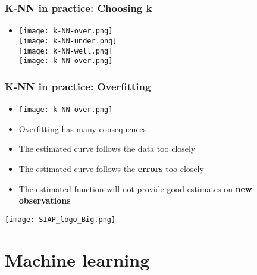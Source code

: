 \documentclass[xcolor=x11names,compress, aspectratio=169]{beamer}
\renewcommand{\(}{\begin{columns}}
\renewcommand{\)}{\end{columns}}
\newcommand{\<}[1]{\begin{column}{#1}}
\renewcommand{\>}{\end{column}}
\begin{document}
\begin{frame}
\frametitle{\textcolor{brique}{ K-NN in practice: \textbf{Choosing k}}}
\begin{itemize}
\item[]
    {\texttt{[image: k-NN-over.png]} \\ }
    {\texttt{[image: k-NN-under.png]} \\ }
    {\texttt{[image: k-NN-well.png]} \\ }
    {\texttt{[image: k-NN-over.png]} \\ }
\end{itemize}
\end{frame}


\begin{frame}
\frametitle{\textcolor{brique}{ K-NN in practice: \textbf{Overfitting}}}
\begin{itemize}[<+->]
\item[] \texttt{[image: k-NN-over.png]}
\item[] Overfitting has many consequences
\item The estimated curve follows the data too closely
\item The estimated curve follows the \textbf{errors} too closely
\item The estimated function will not provide good estimates on \textbf{new observations}
\end{itemize}
\end{frame}


\begin{frame}
\Large{ \color{siap}{Machine Learning for Official Statistics and SDGs}}

\hspace{1cm}


\hspace{2cm}
\begin{center}

\texttt{[image: SIAP\_logo\_Big.png]}

\end{center}
\end{frame}


\section{Machine learning}
\end{document}
